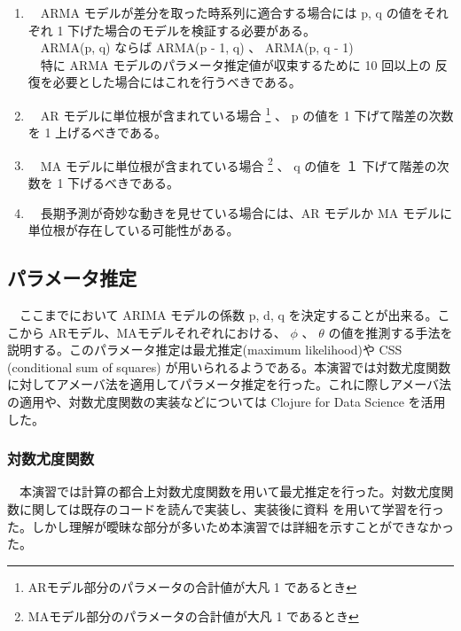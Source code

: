 \documentclass{scrartcl}
\begin{document}
\begin{enumerate}
\item 　ARMA モデルが差分を取った時系列に適合する場合には p, q の値をそれぞれ 1 下げた場合のモデルを検証する必要がある。\\
　ARMA(p, q) ならば ARMA(p - 1, q) 、 ARMA(p, q - 1)\\
　特に ARMA モデルのパラメータ推定値が収束するために 10 回以上の 反復を必要とした場合にはこれを行うべきである。\\
\item 　AR モデルに単位根が含まれている場合 \footnote{ARモデル部分のパラメータの合計値が大凡 1 であるとき} 、 p の値を 1 下げて階差の次数を 1 上げるべきである。\\
\item 　MA モデルに単位根が含まれている場合 \footnote{MAモデル部分のパラメータの合計値が大凡 1 であるとき} 、 q の値を １ 下げて階差の次数を 1 下げるべきである。\\
\item 　長期予測が奇妙な動きを見せている場合には、AR モデルか MA モデルに単位根が存在している可能性がある。\\
\end{enumerate}

\subsection{パラメータ推定}
\label{sec:org3a764e9}
　ここまでにおいて ARIMA モデルの係数 p, d, q を決定することが出来る。ここから ARモデル、MAモデルそれぞれにおける、 \(\phi\) 、 \(\theta\) の値を推測する手法を説明する。このパラメータ推定は最尤推定(maximum likelihood)や CSS (conditional sum of squares) が用いられるようである。本演習では対数尤度関数に対してアメーバ法を適用してパラメータ推定を行った。これに際しアメーバ法の適用や、対数尤度関数の実装などについては Clojure for Data Science \cite{data-science} を活用した。\\
\subsubsection{対数尤度関数}
\label{sec:org94b7172}
　本演習では計算の都合上対数尤度関数を用いて最尤推定を行った。対数尤度関数に関しては既存のコードを読んで実装し、実装後に資料 \cite{log-likelihood} を用いて学習を行った。しかし理解が曖昧な部分が多いため本演習では詳細を示すことができなかった。\\
\end{document}
